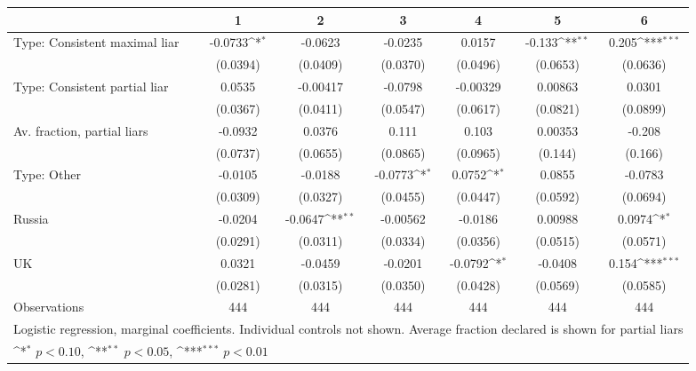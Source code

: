 {
\def\sym#1{\ifmmode^{#1}\else\(^{#1}\)\fi}
\begin{tabular}{l*{6}{c}}
\hline\hline
                &\multicolumn{1}{c}{1}&\multicolumn{1}{c}{2}&\multicolumn{1}{c}{3}&\multicolumn{1}{c}{4}&\multicolumn{1}{c}{5}&\multicolumn{1}{c}{6}\\
\hline
Type: Consistent maximal liar&  -0.0733\sym{*}  &  -0.0623         &  -0.0235         &   0.0157         &   -0.133\sym{**} &    0.205\sym{***}\\
                & (0.0394)         & (0.0409)         & (0.0370)         & (0.0496)         & (0.0653)         & (0.0636)         \\
Type: Consistent partial liar&   0.0535         & -0.00417         &  -0.0798         & -0.00329         &  0.00863         &   0.0301         \\
                & (0.0367)         & (0.0411)         & (0.0547)         & (0.0617)         & (0.0821)         & (0.0899)         \\
Av. fraction, partial liars&  -0.0932         &   0.0376         &    0.111         &    0.103         &  0.00353         &   -0.208         \\
                & (0.0737)         & (0.0655)         & (0.0865)         & (0.0965)         &  (0.144)         &  (0.166)         \\
Type: Other     &  -0.0105         &  -0.0188         &  -0.0773\sym{*}  &   0.0752\sym{*}  &   0.0855         &  -0.0783         \\
                & (0.0309)         & (0.0327)         & (0.0455)         & (0.0447)         & (0.0592)         & (0.0694)         \\
Russia          &  -0.0204         &  -0.0647\sym{**} & -0.00562         &  -0.0186         &  0.00988         &   0.0974\sym{*}  \\
                & (0.0291)         & (0.0311)         & (0.0334)         & (0.0356)         & (0.0515)         & (0.0571)         \\
UK              &   0.0321         &  -0.0459         &  -0.0201         &  -0.0792\sym{*}  &  -0.0408         &    0.154\sym{***}\\
                & (0.0281)         & (0.0315)         & (0.0350)         & (0.0428)         & (0.0569)         & (0.0585)         \\
\hline
Observations    &      444         &      444         &      444         &      444         &      444         &      444         \\
\hline\hline
\multicolumn{7}{l}{\footnotesize Logistic regression, marginal coefficients. Individual controls not shown. Average fraction declared is shown for partial liars}\\
\multicolumn{7}{l}{\footnotesize \sym{*} \(p<0.10\), \sym{**} \(p<0.05\), \sym{***} \(p<0.01\)}\\
\end{tabular}
}
